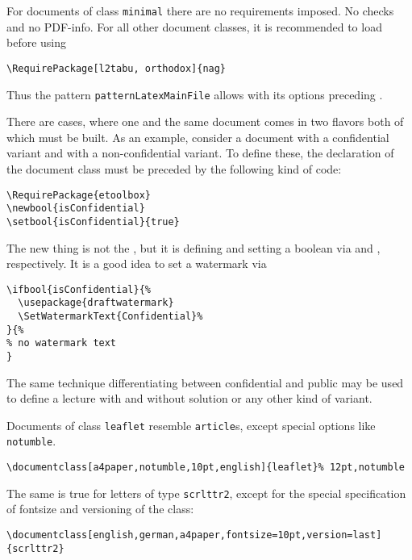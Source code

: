For documents of class \texttt{minimal} there are no requirements imposed. 
No checks and no PDF-info. 
For all other document classes, it is recommended to load  
before  using 
%
\begin{Verbatim}[fontsize=\small]
  \RequirePackage[l2tabu, orthodox]{nag}
\end{Verbatim}
%
Thus the pattern \texttt{patternLatexMainFile} 
allows  with its options preceding . 

There are cases, where one and the same document 
comes in two flavors both of which must be built. 
As an example, consider a document with a confidential variant 
and with a non-confidential variant. 
To define these, the declaration of the document class 
must be preceded by the following kind of code: 
%
\begin{Verbatim}[fontsize=\small]
\RequirePackage{etoolbox}
\newbool{isConfidential}
\setbool{isConfidential}{true}
\end{Verbatim}

The new thing is not the , 
but it is defining and setting a boolean 
via  and , respectively. 
It is a good idea to set a watermark via 
%
\begin{Verbatim}[fontsize=\small]
\ifbool{isConfidential}{%
  \usepackage{draftwatermark}
  \SetWatermarkText{Confidential}%
}{%
% no watermark text
}
\end{Verbatim}

The same technique differentiating between confidential and public 
may be used to define a lecture with and without solution 
or any other kind of variant. 

Documents of class \texttt{leaflet} resemble \texttt{article}s, 
except special options like \texttt{notumble}. 

\begin{Verbatim}[fontsize=\footnotesize]
  \documentclass[a4paper,notumble,10pt,english]{leaflet}% 12pt,notumble
\end{Verbatim}

The same is true for letters of type \texttt{scrlttr2}, 
except for the special specification of fontsize and versioning of the class: 

\begin{Verbatim}[fontsize=\footnotesize]
\documentclass[english,german,a4paper,fontsize=10pt,version=last]{scrlttr2}
\end{Verbatim}


